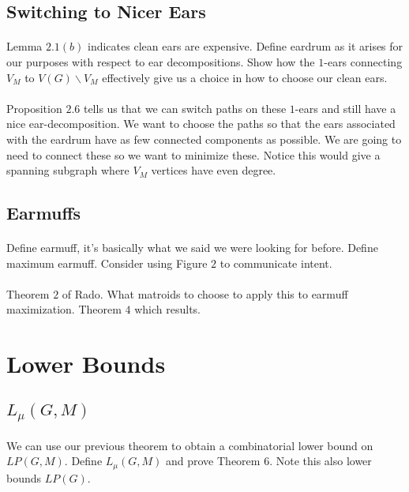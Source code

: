 \documentclass[letterpaper,12pt,oneside,onecolumn]{article}
\begin{document}
\subsection{Switching to Nicer Ears}
\paragraph{}
Lemma $2.1(b)$ indicates clean ears are expensive. Define eardrum as it arises for our purposes with respect to ear decompositions. Show how the $1$-ears connecting $V_M$ to $V(G)\backslash V_M$ effectively give us a choice in how to choose our clean ears.
\paragraph{}
Proposition $2.6$ tells us that we can switch paths on these $1$-ears and still have a nice ear-decomposition. We want to choose the paths so that the ears associated with the eardrum have as few connected components as possible. We are going to need to connect these so we want to minimize these. Notice this would give a spanning subgraph where $V_M$ vertices have even degree.
\subsection{Earmuffs}
\paragraph{}
Define earmuff, it's basically what we said we were looking for before. Define maximum earmuff. Consider using Figure $2$ to communicate intent.
\paragraph{}
Theorem $2$ of Rado. What matroids to choose to apply this to earmuff maximization. Theorem $4$ which results.
\section{Lower Bounds}
\subsection{$L_\mu(G,M)$}
\paragraph{}
We can use our previous theorem to obtain a combinatorial lower bound on $LP(G,M)$. Define $L_\mu(G,M)$ and prove Theorem $6$. Note this also lower bounds $LP(G)$.
\end{document}
